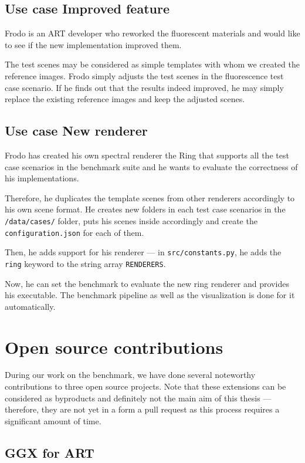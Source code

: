 \subsection{Use case Improved feature}

Frodo is an ART developer who reworked the fluorescent materials and would like to see if the new implementation improved them.

The test scenes may be considered as simple templates with whom we created the reference images. Frodo simply adjusts the test scenes in the fluorescence test case scenario. If he finds out that the results indeed improved, he may simply replace the existing reference images and keep the adjusted scenes.

\subsection{Use case New renderer}

Frodo has created his own spectral renderer the Ring that supports all the test case scenarios in the benchmark suite and he wants to evaluate the correctness of his implementations.

Therefore, he duplicates the template scenes from other renderers accordingly to his own scene format. He creates new folders in each test case scenarios in the \texttt{/data/cases/} folder, puts his scenes inside accordingly and create the \texttt{configuration.json} for each of them.

Then, he adds support for his renderer --- in \texttt{src/constants.py}, he adds the \texttt{ring} keyword to the string array \texttt{RENDERERS}.

Now, he can set the benchmark to evaluate the new ring renderer and provides his executable. The benchmark pipeline as well as the visualization is done for it automatically.

\section{Open source contributions}

During our work on the benchmark, we have done several noteworthy contributions to three open source projects. Note that these extensions can be considered as byproducts and definitely not the main aim of this thesis --- therefore, they are not yet in a form a pull request as this process requires a significant amount of time.

\subsection{GGX for ART}

